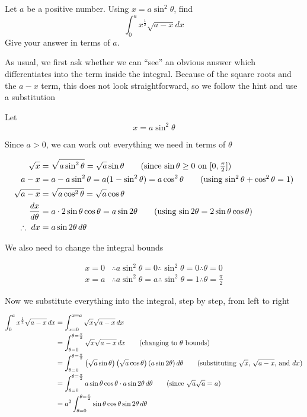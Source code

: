 \begin{example}
    Let $a$ be a positive number. Using $x = a \sin^2 \theta$, find
    \[ \int_0^{a} x^{\frac{1}{2}} \sqrt{a - x} dx\]
    Give your answer in terms of $a$.
\end{example}
\begin{solution}
    As usual, we first ask whether we can ``see'' an obvious answer which differentiates into the term inside the integral. Because of the square roots and the $a - x$ term, this does not look straightforward, so we follow the hint and use a substitution

    Let
    \[
        x = a \sin^2 \theta
    \]

    Since $a > 0$, we can work out everything we need in terms of $\theta$

    \begin{align*}
        \sqrt{x} &= \sqrt{a \sin^2 \theta} = \sqrt{a}\sin \theta \tag{since $\sin \theta \ge 0$ on $[0,\tfrac{\pi}{2}]$} \\
        a - x &= a - a \sin^2 \theta = a(1 - \sin^2 \theta) = a \cos^2 \theta \tag{using $\sin^2 \theta + \cos^2 \theta = 1$} \\
        \sqrt{a - x} &= \sqrt{a \cos^2 \theta} = \sqrt{a}\cos \theta \\
        \frac{dx}{d\theta} &= a \cdot 2\sin \theta \cos \theta = a \sin 2\theta \tag{using $\sin 2\theta = 2\sin \theta \cos \theta$} \\
        \therefore \ dx &= a \sin 2\theta \, d\theta
    \end{align*}

    We also need to change the integral bounds

    \begin{align*}
        x = 0 &\therefore a \sin^2 \theta = 0 \therefore \sin^2 \theta = 0 \therefore \theta = 0 \\
        x = a &\therefore a \sin^2 \theta = a \therefore \sin^2 \theta = 1 \therefore \theta = \frac{\pi}{2}
    \end{align*}

    Now we substitute everything into the integral, step by step, from left to right

    \begin{align*}
        \int_0^{a} x^{\frac{1}{2}} \sqrt{a - x} \, dx 
        &= \int_{x=0}^{x=a} \sqrt{x} \sqrt{a - x} \, dx \\
        &= \int_{\theta=0}^{\theta=\frac{\pi}{2}} \sqrt{x} \sqrt{a - x} \, dx \tag{changing to $\theta$ bounds} \\
        &= \int_{\theta=0}^{\theta=\frac{\pi}{2}} \left(\sqrt{a}\sin \theta\right) \left(\sqrt{a}\cos \theta\right) \left(a \sin 2\theta \right) d\theta \tag{substituting $\sqrt{x}$, $\sqrt{a-x}$, and $dx$} \\
        &= \int_{\theta=0}^{\theta=\frac{\pi}{2}} a \sin \theta \cos \theta \cdot a \sin 2\theta \, d\theta \tag{since $\sqrt{a}\sqrt{a} = a$} \\
        &= a^2 \int_{\theta=0}^{\theta=\frac{\pi}{2}} \sin \theta \cos \theta \sin 2\theta \, d\theta
    \end{align*}


\end{solution}
